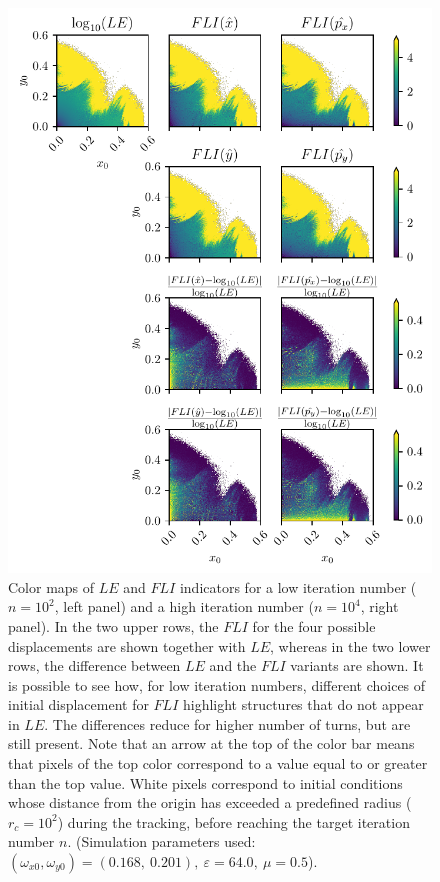 \begin{figure}[htp]
    \includegraphics[width=\columnwidth]{6_dynamic_indicators/figs/LE_FLI_high.pdf}
    \caption{Color maps of $LE$ and $FLI$ indicators for a low iteration number ($n=10^2$, left panel) and a high iteration number ($n=10^4$, right panel). In the two upper rows, the $FLI$ for the four possible displacements are shown together with $LE$, whereas in the two lower rows, the difference between $LE$ and the $FLI$ variants are shown. It is possible to see how, for low iteration numbers,  different choices of initial displacement for $FLI$ highlight structures that do not appear in $LE$. The differences reduce for higher number of turns, but are still present. Note that an arrow at the top of the color bar means that pixels of the top color correspond to a value equal to or greater than the top value. White pixels correspond to initial conditions whose distance from the origin has exceeded a predefined radius ($r_c=10^2$) during the tracking, before reaching the target iteration number $n$. (Simulation parameters used: $(\omega_{x0},\omega_{y0})= (0.168,\ 0.201),\ \varepsilon=64.0,\ \mu=0.5$).}
    \label{fig:le_fli_compare_short_long}
\end{figure}

